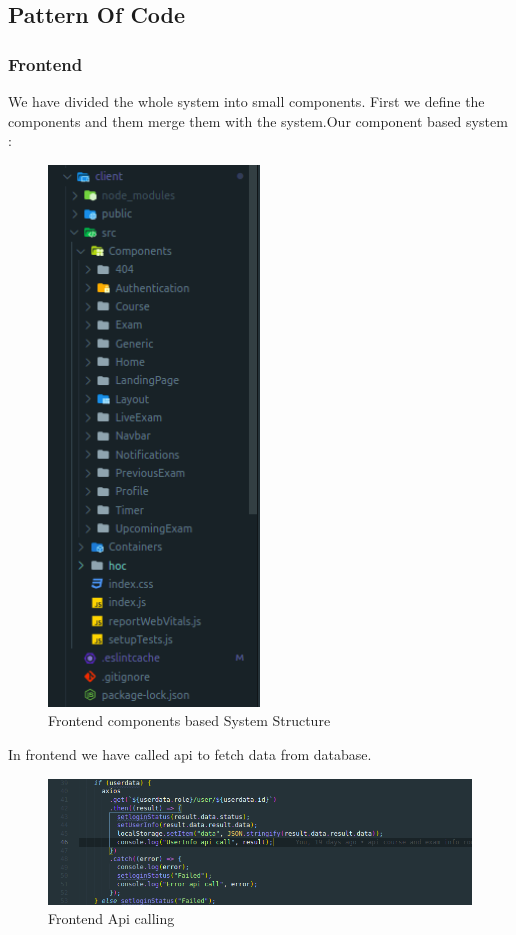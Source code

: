 \documentclass[10pt]{article}
\begin{document}
\subsection{Pattern Of Code}

\subsubsection{Frontend}

We have divided the whole system into small components. First we define the components and them merge them with the system.Our component based system :

\begin{figure}[H]
  \centering
  \centerline{\includegraphics[width=0.5\textwidth]{frontend-components.png}}
  \caption{Frontend components based System Structure}
  \label{fig}
\end{figure}

In frontend we have called api to fetch data from database.

\begin{figure}[H]
  \centering
  \centerline{\includegraphics[width=\textwidth]{api-call2.png}}
  \caption{Frontend Api calling}
  \label{fig}
\end{figure}
\end{document}
